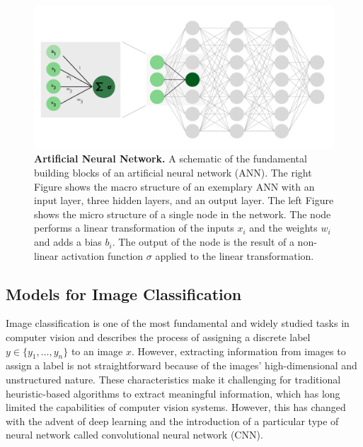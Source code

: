 \documentclass[a4paper]{article}
\begin{document}
\begin{figure}
  \begin{center}
    \includegraphics[width=\textwidth]{./figures/ann.png}
  \end{center}

  \caption{\textbf{Artificial Neural Network.} A schematic of the fundamental
    building blocks of an artificial neural network (ANN). The right Figure
    shows the macro structure of an exemplary ANN with an input layer, three
    hidden layers, and an output layer. The left Figure shows the micro
    structure of a single node in the network. The node performs a linear
    transformation of the inputs $x_i$ and the weights $w_i$ and adds a bias
    $b_i$. The output of the node is the result of a non-linear activation
    function $\sigma$ applied to the linear transformation.}
  \label{fig:ann}
\end{figure}

\subsection{Models for Image Classification}
\label{sub:image-classification}

Image classification is one of the most fundamental and widely studied tasks in
computer vision and describes the process of assigning a discrete label $y \in
\{y_1, \ldots, y_n\}$ to an image $x$. However, extracting information from
images to assign a label is not straightforward because of the images'
high-dimensional and unstructured nature. These characteristics make it
challenging for traditional heuristic-based algorithms to extract meaningful
information, which has long limited the capabilities of computer vision systems.
However, this has changed with the advent of deep learning and the introduction
of a particular type of neural network called convolutional neural network
(CNN).
\end{document}
